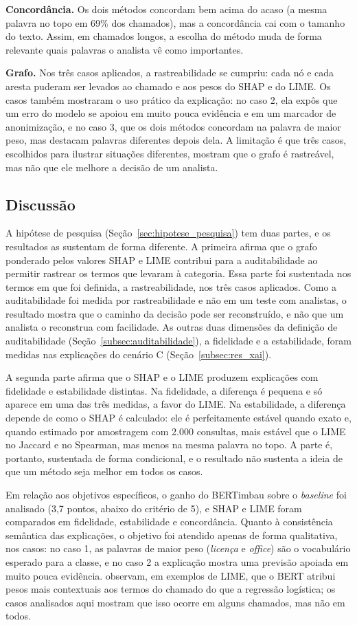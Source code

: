 \documentclass[
    12pt,                %
    openright,           %
    oneside,             %
    a4paper,             %
    english,             %
    brazil               %
]{abntex2}
\begin{document}
\textbf{Concordância.} Os dois métodos concordam bem acima do acaso (a mesma palavra no topo em 69\% dos chamados), mas a concordância cai com o tamanho do texto. Assim, em chamados longos, a escolha do método muda de forma relevante quais palavras o analista vê como importantes.
 
\textbf{Grafo.} Nos três casos aplicados, a rastreabilidade se cumpriu: cada nó e cada aresta puderam ser levados ao chamado e aos pesos do SHAP e do LIME. Os casos também mostraram o uso prático da explicação: no caso 2, ela expôs que um erro do modelo se apoiou em muito pouca evidência e em um marcador de anonimização, e no caso 3, que os dois métodos concordam na palavra de maior peso, mas destacam palavras diferentes depois dela. A limitação é que três casos, escolhidos para ilustrar situações diferentes, mostram que o grafo é rastreável, mas não que ele melhore a decisão de um analista.

\subsection{Discussão}
A hipótese de pesquisa (Seção~\ref{sec:hipotese_pesquisa}) tem duas partes, e os resultados as sustentam de forma diferente. A primeira afirma que o grafo ponderado pelos valores SHAP e LIME contribui para a auditabilidade ao permitir rastrear os termos que levaram à categoria. Essa parte foi sustentada nos termos em que foi definida, a rastreabilidade, nos três casos aplicados. Como a auditabilidade foi medida por rastreabilidade e não em um teste com analistas, o resultado mostra que o caminho da decisão pode ser reconstruído, e não que um analista o reconstrua com facilidade. As outras duas dimensões da definição de auditabilidade (Seção~\ref{subsec:auditabilidade}), a fidelidade e a estabilidade, foram medidas nas explicações do cenário C (Seção~\ref{subsec:res_xai}).
 
A segunda parte afirma que o SHAP e o LIME produzem explicações com fidelidade e estabilidade distintas. Na fidelidade, a diferença é pequena e só aparece em uma das três medidas, a favor do LIME. Na estabilidade, a diferença depende de como o SHAP é calculado: ele é perfeitamente estável quando exato e, quando estimado por amostragem com 2.000 consultas, mais estável que o LIME no Jaccard e no Spearman, mas menos na mesma palavra no topo. A parte é, portanto, sustentada de forma condicional, e o resultado não sustenta a ideia de que um método seja melhor em todos os casos.
 
Em relação aos objetivos específicos, o ganho do BERTimbau sobre o \textit{baseline} foi analisado (3,7 pontos, abaixo do critério de 5), e SHAP e LIME foram comparados em fidelidade, estabilidade e concordância. Quanto à consistência semântica das explicações, o objetivo foi atendido apenas de forma qualitativa, nos casos: no caso 1, as palavras de maior peso (\textit{licença} e \textit{office}) são o vocabulário esperado para a classe, e no caso 2 a explicação mostra uma previsão apoiada em muito pouca evidência.  observam, em exemplos de LIME, que o BERT atribui pesos mais contextuais aos termos do chamado do que a regressão logística; os casos analisados aqui mostram que isso ocorre em alguns chamados, mas não em todos.
 
\end{document}
